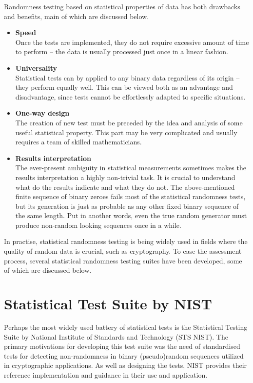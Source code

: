 \documentclass[12pt,oneside]{fithesis2}
\begin{document}
Randomness testing based on statistical properties of data has both drawbacks and benefits, main of which are discussed below.
\begin{itemize} \rightskip=2em
\item \textbf{Speed}\\
Once the tests are implemented, they do not require excessive amount of time to perform -- 
the data is usually processed just once in a linear fashion.
\item \textbf{Universality}\\
Statistical tests can by applied to any binary data regardless of its origin -- they perform equally well. 
This can be viewed both as an advantage and disadvantage, since tests cannot be effortlessly adapted to specific situations.
\item \textbf{One-way design}\\
The creation of new test must be preceded by the idea and analysis of some useful statistical property. This part may be 
very complicated and usually requires a team of skilled mathematicians.
\item \textbf{Results interpretation}\\
The ever-present ambiguity in statistical measurements sometimes makes the results interpretation a highly non-trivial task.
It is crucial to understand what do the results indicate and what they do not. The above-mentioned finite sequence of binary zeroes
fails most of the statistical randomness tests, but its generation is just as probable 
as any other fixed binary sequence of the same length.
Put in another words, even the true random generator must produce non-random looking sequences once in a while.
\end{itemize}

\noindent
In practise, statistical randomness testing is being widely used in fields where the quality of random data is crucial, 
such as cryptography. To ease the assessment process, several statistical randomness testing suites have been developed, 
some of which are discussed below.

\section{Statistical Test Suite by NIST}
\label{sec:sts-nist}

Perhaps the most widely used battery of statistical tests is the Statistical Testing Suite 
by National Institute of Standards and Technology (STS NIST).
The primary motivations for developing this test suite was the need of standardised tests for detecting non-randomness 
in binary (pseudo)random sequences utilized in cryptographic applications. As well as designing the tests,
NIST provides their reference implementation and guidance in their use and application. \cite{web NIST}
\end{document}
